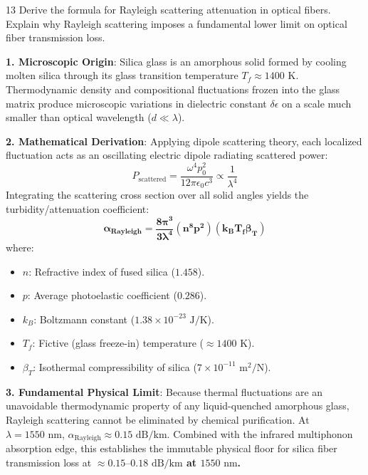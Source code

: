\begin{theoryq}{13}
Derive the formula for Rayleigh scattering attenuation in optical fibers. Explain why Rayleigh scattering imposes a fundamental lower limit on optical fiber transmission loss.
\end{theoryq}
\begin{theorysol}
\textbf{1. Microscopic Origin}:
Silica glass is an amorphous solid formed by cooling molten silica through its glass transition temperature $T_f \approx 1400\text{ K}$.
Thermodynamic density and compositional fluctuations frozen into the glass matrix produce microscopic variations in dielectric constant $\delta\epsilon$ on a scale much smaller than optical wavelength ($d \ll \lambda$).

\textbf{2. Mathematical Derivation}:
Applying dipole scattering theory, each localized fluctuation acts as an oscillating electric dipole radiating scattered power:
\begin{equation}
P_{\text{scattered}} = \frac{\omega^4 p_0^2}{12\pi \epsilon_0 c^3} \propto \frac{1}{\lambda^4}
\end{equation}
Integrating the scattering cross section over all solid angles yields the turbidity/attenuation coefficient:
\begin{equation}
\mathbf{\alpha_{\text{Rayleigh}} = \frac{8\pi^3}{3\lambda^4}(n^8 p^2)(k_B T_f \beta_T)}
\end{equation}
where:
\begin{itemize}
    \item $n$: Refractive index of fused silica ($1.458$).
    \item $p$: Average photoelastic coefficient ($0.286$).
    \item $k_B$: Boltzmann constant ($1.38 \times 10^{-23}\text{ J/K}$).
    \item $T_f$: Fictive (glass freeze-in) temperature ($\approx 1400\text{ K}$).
    \item $\beta_T$: Isothermal compressibility of silica ($7 \times 10^{-11}\text{ m}^2/\text{N}$).
\end{itemize}

\textbf{3. Fundamental Physical Limit}:
Because thermal fluctuations are an unavoidable thermodynamic property of any liquid-quenched amorphous glass, Rayleigh scattering cannot be eliminated by chemical purification.
At $\lambda = 1550\text{ nm}$, $\alpha_{\text{Rayleigh}} \approx 0.15\text{ dB/km}$. Combined with the infrared multiphonon absorption edge, this establishes the immutable physical floor for silica fiber transmission loss at \textbf{$\approx 0.15\text{--}0.18\text{ dB/km}$ at $1550\text{ nm}$.}
\end{theorysol}
\vspace{4mm}


